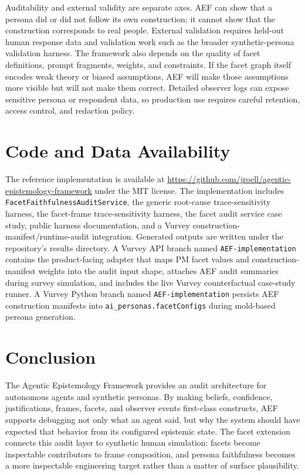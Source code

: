 \documentclass[10pt,a4paper]{article}
\newcommand{\method}{AEF}
\begin{document}
Auditability and external validity are separate axes. \method{} can show that a persona did or did not follow its own construction; it cannot show that the construction corresponds to real people. External validation requires held-out human response data and validation work such as the broader synthetic-persona validation harness. The framework also depends on the quality of facet definitions, prompt fragments, weights, and constraints. If the facet graph itself encodes weak theory or biased assumptions, \method{} will make those assumptions more visible but will not make them correct. Detailed observer logs can expose sensitive persona or respondent data, so production use requires careful retention, access control, and redaction policy.

\section{Code and Data Availability}
The reference implementation is available at \url{https://github.com/jroell/agentic-epistemology-framework} under the MIT license. The implementation includes \texttt{FacetFaithfulnessAuditService}, the generic root-cause trace-sensitivity harness, the facet-frame trace-sensitivity harness, the facet audit service case study, public harness documentation, and a Vurvey construction-manifest/runtime-audit integration. Generated outputs are written under the repository's results directory. A Vurvey API branch named \texttt{AEF-implementation} contains the product-facing adapter that maps PM facet values and construction-manifest weights into the audit input shape, attaches AEF audit summaries during survey simulation, and includes the live Vurvey counterfactual case-study runner. A Vurvey Python branch named \texttt{AEF-implementation} persists AEF construction manifests into \texttt{ai\_personas.facetConfigs} during mold-based persona generation.

\section{Conclusion}
The Agentic Epistemology Framework provides an audit architecture for autonomous agents and synthetic personas. By making beliefs, confidence, justifications, frames, facets, and observer events first-class constructs, \method{} supports debugging not only what an agent said, but why the system should have expected that behavior from its configured epistemic state. The facet extension connects this audit layer to synthetic human simulation: facets become inspectable contributors to frame composition, and persona faithfulness becomes a more inspectable engineering target rather than a matter of surface plausibility.



\end{document}
